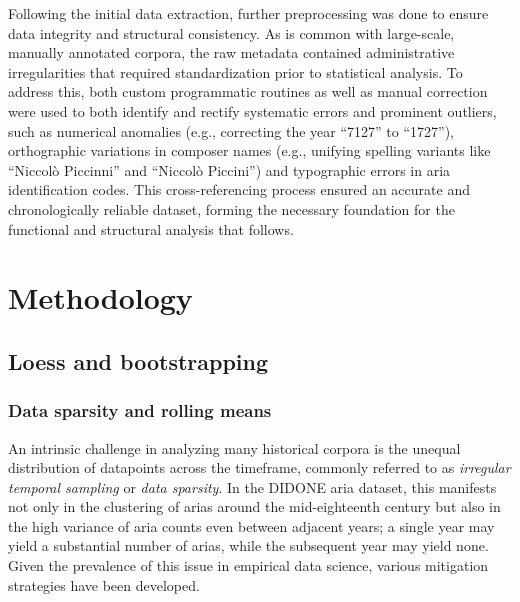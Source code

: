 \documentclass[10pt,a4paper,twocolumn]{article}
\begin{document}
Following the initial data extraction, further preprocessing was done to ensure data integrity and structural consistency. As is common with large-scale, manually annotated corpora, the raw metadata contained administrative irregularities that required standardization prior to statistical analysis. To address this, both custom programmatic routines as well as manual correction were used to both identify and rectify systematic errors and prominent outliers, such as numerical anomalies (e.g., correcting the year \enquote{7127} to \enquote{1727}), orthographic variations in composer names (e.g., unifying spelling variants like \enquote{Niccolò Piccinni} and  \enquote{Niccolò Piccini}) and typographic errors in aria identification codes. This cross-referencing process ensured an accurate and chronologically reliable dataset, forming the necessary foundation for the functional and structural analysis that follows.

\section{Methodology}\label{sec:method}
\subsection{Loess and bootstrapping}
\subsubsection{Data sparsity and rolling means}
An intrinsic challenge in analyzing many historical corpora is the unequal distribution of datapoints across the timeframe, commonly referred to as \textit{irregular temporal sampling} or \textit{data sparsity}. In the DIDONE aria dataset, this manifests not only in the clustering of arias around the mid-eighteenth century but also in the high variance of aria counts even between adjacent years; a single year may yield a substantial number of arias, while the subsequent year may yield none. Given the prevalence of this issue in empirical data science, various mitigation strategies have been developed.
\end{document}
